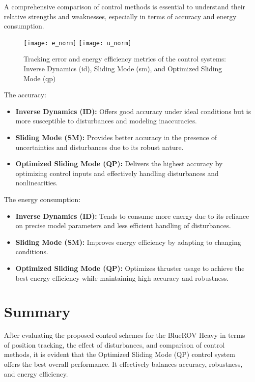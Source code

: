     A comprehensive comparison of control methods is essential to understand their relative strengths and weaknesses, especially in terms of accuracy and energy consumption.
    \begin{figure}[H]
        \begin{center}
            \texttt{[image: e\_norm]}
            \texttt{[image: u\_norm]}
        \end{center}
        \caption{Tracking error and energy efficiency metrics of the control systems: Inverse Dynamics (id), Sliding Mode (sm), and Optimized Sliding Mode (qp)}
        \label{image:}
    \end{figure}
    The accuracy:
    \begin{itemize}
        \item \textbf{Inverse Dynamics (ID):} Offers good accuracy under ideal conditions but is more susceptible to disturbances and modeling inaccuracies.
        \item \textbf{Sliding Mode (SM):} Provides better accuracy in the presence of uncertainties and disturbances due to its robust nature.
        \item \textbf{Optimized Sliding Mode (QP):} Delivers the highest accuracy by optimizing control inputs and effectively handling disturbances and nonlinearities.
    \end{itemize}
    The energy consumption:
    \begin{itemize}
        \item \textbf{Inverse Dynamics (ID):} Tends to consume more energy due to its reliance on precise model parameters and less efficient handling of disturbances.
        \item \textbf{Sliding Mode (SM):} Improves energy efficiency by adapting to changing conditions.
        \item \textbf{Optimized Sliding Mode (QP):} Optimizes thruster usage to achieve the best energy efficiency while maintaining high accuracy and robustness.
    \end{itemize}

\section{Summary}

    After evaluating the proposed control schemes for the BlueROV Heavy in terms of position tracking, the effect of disturbances, and comparison of control methods, it is evident that the Optimized Sliding Mode (QP) control system offers the best overall performance. It effectively balances accuracy, robustness, and energy efficiency.



    

